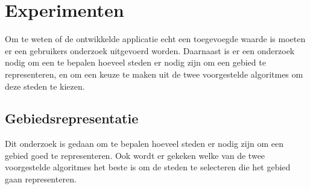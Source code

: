 \documentclass[twoside,openright]{uva-bachelor-thesis}
\begin{document}
\chapter{Experimenten}
	Om te weten of de ontwikkelde applicatie echt een toegevoegde waarde is moeten er een gebruikers onderzoek uitgevoerd worden. Daarnaast is er een onderzoek nodig om een te bepalen hoeveel steden er nodig zijn om een gebied te representeren, en om een keuze te maken uit de twee voorgestelde algoritmes om deze steden te kiezen.
	\section{Gebiedsrepresentatie}
	\label{sec:numcities}
		Dit onderzoek is gedaan om te bepalen hoeveel steden er nodig zijn om een gebied goed te representeren. Ook wordt er gekeken welke van de twee voorgestelde algoritmes het beste is om de steden te selecteren die het gebied gaan representeren.
\end{document}
